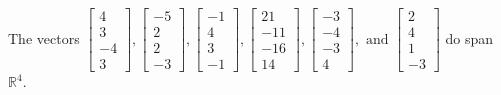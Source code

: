 \begin{exercise}
\begin{exerciseStatement}
  \end{exerciseStatement}
  \begin{exerciseAnswer}
   The vectors \(\left[\begin{array}{r}
4 \\
3 \\
-4 \\
3
\end{array}\right] , \left[\begin{array}{r}
-5 \\
2 \\
2 \\
-3
\end{array}\right] , \left[\begin{array}{r}
-1 \\
4 \\
3 \\
-1
\end{array}\right] , \left[\begin{array}{r}
21 \\
-11 \\
-16 \\
14
\end{array}\right] , \left[\begin{array}{r}
-3 \\
-4 \\
-3 \\
4
\end{array}\right] , \text{ and } \left[\begin{array}{r}
2 \\
4 \\
1 \\
-3
\end{array}\right]\) 
  	 do  
	span \(\mathbb{R}^4\).
  


  \end{exerciseAnswer}
\end{exercise}